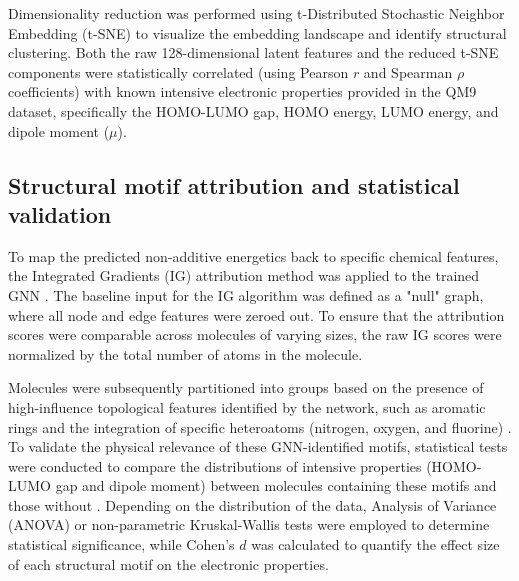 \documentclass[]{article}
\begin{document}
Dimensionality reduction was performed using t-Distributed Stochastic Neighbor Embedding (t-SNE) to visualize the embedding landscape and identify structural clustering. Both the raw 128-dimensional latent features and the reduced t-SNE components were statistically correlated (using Pearson $r$ and Spearman $\rho$ coefficients) with known intensive electronic properties provided in the QM9 dataset, specifically the HOMO-LUMO gap, HOMO energy, LUMO energy, and dipole moment ($\mu$).

\subsection{Structural motif attribution and statistical validation}
To map the predicted non-additive energetics back to specific chemical features, the Integrated Gradients (IG) attribution method was applied to the trained GNN \citep{ji2026molledgeradditivegraphneural}. The baseline input for the IG algorithm was defined as a "null" graph, where all node and edge features were zeroed out. To ensure that the attribution scores were comparable across molecules of varying sizes, the raw IG scores were normalized by the total number of atoms in the molecule.

Molecules were subsequently partitioned into groups based on the presence of high-influence topological features identified by the network, such as aromatic rings and the integration of specific heteroatoms (nitrogen, oxygen, and fluorine) \citep{esders2024analyzingatomicinteractionsmolecules,polat2025understandingcapabilitiesmoleculargraph}. To validate the physical relevance of these GNN-identified motifs, statistical tests were conducted to compare the distributions of intensive properties (HOMO-LUMO gap and dipole moment) between molecules containing these motifs and those without \citep{gilmer2017neuralmessagepassingquantum,choi2022scalabletraininggraphconvolutional}. Depending on the distribution of the data, Analysis of Variance (ANOVA) or non-parametric Kruskal-Wallis tests were employed to determine statistical significance, while Cohen's $d$ was calculated to quantify the effect size of each structural motif on the electronic properties.
\end{document}
